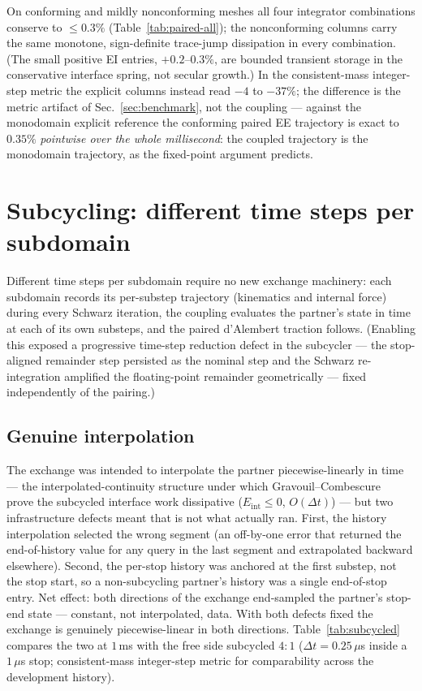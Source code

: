 \documentclass[11pt]{article}
\begin{document}
On conforming and mildly nonconforming meshes all four integrator
combinations conserve to $\le 0.3\%$ (Table~\ref{tab:paired-all}); the
nonconforming columns carry the same monotone, sign-definite trace-jump
dissipation in every combination. (The small positive EI entries,
$+0.2$--$0.3\%$, are bounded transient storage in the conservative
interface spring, not secular growth.) In the consistent-mass integer-step
metric the explicit columns instead read $-4$ to $-37\%$; the difference is
the metric artifact of Sec.~\ref{sec:benchmark}, not the coupling ---
against the monodomain explicit reference the conforming paired EE
trajectory is exact to $0.35\%$ \emph{pointwise over the whole
millisecond}: the coupled trajectory is the monodomain trajectory, as the
fixed-point argument predicts.

\section{Subcycling: different time steps per subdomain}
\label{sec:subcycle}

Different time steps per subdomain require no new exchange machinery: each
subdomain records its per-substep trajectory (kinematics and internal
force) during every Schwarz iteration, the coupling evaluates the partner's
state in time at each of its own substeps, and the paired d'Alembert
traction follows. (Enabling this exposed a progressive time-step reduction defect in the
subcycler --- the stop-aligned remainder step persisted as the nominal step
and the Schwarz re-integration amplified the floating-point remainder
geometrically --- fixed independently of the pairing.)

\subsection{Genuine interpolation}
\label{sec:gc}

The exchange was intended to interpolate the partner piecewise-linearly in
time --- the interpolated-continuity structure under which
Gravouil--Combescure~\cite{GravouilCombescure2001} prove the subcycled
interface work dissipative ($E_{\mathrm{int}} \le 0$, $O(\Delta t)$) --- but two infrastructure defects
meant that is not what actually ran. First, the history interpolation
selected the wrong segment (an off-by-one error that returned the
end-of-history value for any query in the last segment and extrapolated
backward elsewhere). Second, the per-stop history was anchored at the first
substep, not the stop start, so a non-subcycling partner's history was a
single end-of-stop entry. Net effect: both directions of the exchange
end-sampled the partner's stop-end state --- constant, not interpolated,
data. With both defects fixed the exchange is genuinely piecewise-linear in
both directions. Table~\ref{tab:subcycled} compares the two at $1$\,ms with
the free side subcycled $4{:}1$ ($\Delta t = 0.25\,\mu$s inside a $1\,\mu$s
stop; consistent-mass integer-step metric for comparability across the
development history).
\end{document}
